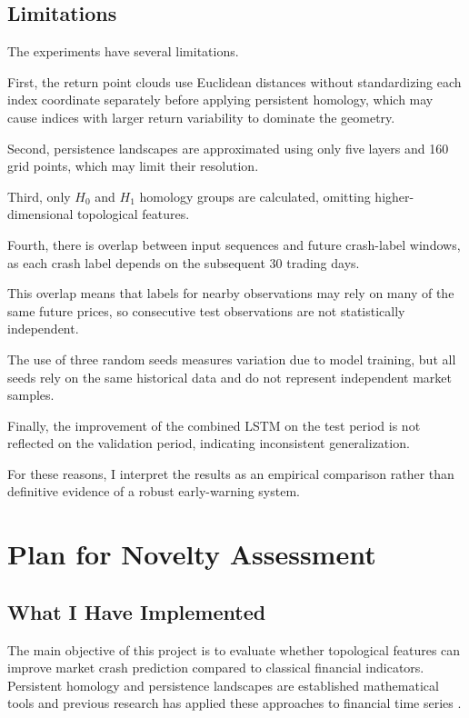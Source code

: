 \documentclass[oneside,english,11pt]{article}
\begin{document}
\FloatBarrier

\subsection{Limitations}

The experiments have several limitations. 

First, the return point clouds use Euclidean distances without standardizing each index coordinate separately before applying persistent homology, which may cause indices with larger return variability to dominate the geometry. 

Second, persistence landscapes are approximated using only five layers and 160 grid points, which may limit their resolution.

Third, only $H_0$ and $H_1$ homology groups are calculated, omitting higher-dimensional topological features.

Fourth, there is overlap between input sequences and future crash-label windows, as each crash label depends on the subsequent 30 trading days.

This overlap means that labels for nearby observations may rely on many of the same future prices, so consecutive test observations are not statistically independent.

The use of three random seeds measures variation due to model training, but all seeds rely on the same historical data and do not represent independent market samples.

Finally, the improvement of the combined LSTM on the test period is not reflected on the validation period, indicating inconsistent generalization. 

For these reasons, I interpret the results as an empirical comparison rather than definitive evidence of a robust early-warning system.



\section{Plan for Novelty Assessment}
\label{sec:novelty}

\subsection{What I Have Implemented}

The main objective of this project is to evaluate whether topological features can improve market crash prediction compared to classical financial indicators. Persistent homology and persistence landscapes are established mathematical tools
\citep{edelsbrunner2002,bubenik2015}
and previous research has applied these approaches to financial time series 
\citep{gidea2018,ismail2022}.
\end{document}
